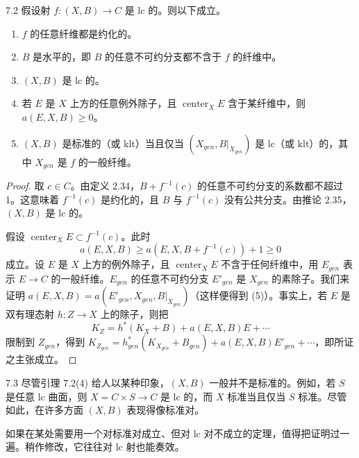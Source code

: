 
\begin{lemmap}{7.2}
假设射 $f\colon(X,B)\to C$ 是 lc 的。则以下成立。
\begin{enumerate}[label=(\arabic*),leftmargin=2.4em,itemsep=1pt,topsep=2pt,parsep=0pt]
\item $f$ 的任意纤维都是约化的。
\item $B$ 是水平的，即 $B$ 的任意不可约分支都不含于 $f$ 的纤维中。
\item $(X,B)$ 是 lc 的。
\item 若 $E$ 是 $X$ 上方的任意例外除子，且 $\operatorname{center}_XE$ 含于某纤维中，则 $a(E,X,B)\ge0$。
\item $(X,B)$ 是标准的（或 klt）当且仅当 $(X_{gen},B|_{X_{gen}})$ 是 lc（或 klt）的，其中 $X_{gen}$ 是 $f$ 的一般纤维。
\end{enumerate}
\end{lemmap}

\begin{proof}
取 $c\in C$。由定义 2.34，$B+f^{-1}(c)$ 的任意不可约分支的系数都不超过 1。这意味着 $f^{-1}(c)$ 是约化的，且 $B$ 与 $f^{-1}(c)$ 没有公共分支。由推论 2.35，$(X,B)$ 是 lc 的。

假设 $\operatorname{center}_XE\subset f^{-1}(c)$。此时
\[
a(E,X,B)\ge a(E,X,B+f^{-1}(c))+1\ge0
\]
成立。设 $E$ 是 $X$ 上方的例外除子，且 $\operatorname{center}_XE$ 不含于任何纤维中，用 $E_{gen}$ 表示 $E\to C$ 的一般纤维。$E_{gen}$ 的任意不可约分支 $E'_{gen}$ 是 $X_{gen}$ 的素除子。我们来证明 $a(E,X,B)=a(E'_{gen},X_{gen},B|_{X_{gen}})$（这样便得到 (5)）。事实上，若 $E$ 是双有理态射 $h\colon Z\to X$ 上的除子，则把
\[
K_Z=h^*(K_X+B)+a(E,X,B)E+\cdots
\]
限制到 $Z_{gen}$，得到 $K_{Z_{gen}}=h_{gen}^*(K_{X_{gen}}+B_{gen})+a(E,X,B)E'_{gen}+\cdots$，即所证之主张成立。
\end{proof}

\begin{remark}{7.3}
尽管引理 7.2(4) 给人以某种印象，$(X,B)$ 一般并不是标准的。例如，若 $S$ 是任意 lc 曲面，则 $X=C\times S\to C$ 是 lc 的，而 $X$ 标准当且仅当 $S$ 标准。尽管如此，在许多方面 $(X,B)$ 表现得像标准对。

如果在某处需要用一个对标准对成立、但对 lc 对不成立的定理，值得把证明过一遍。稍作修改，它往往对 lc 射也能奏效。
\end{remark}


